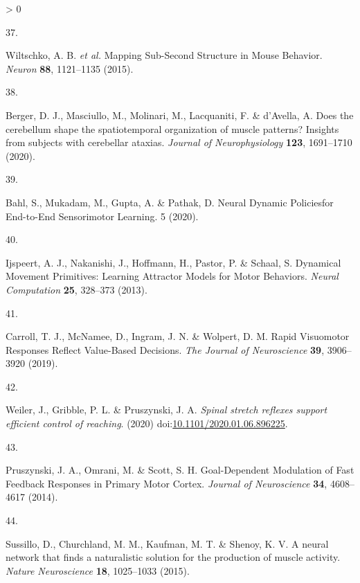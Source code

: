 \documentclass[
  a4paper,
]{article}
\newlength{\cslhangindent}
\newlength{\csllabelwidth}
\newenvironment{CSLReferences}[2] %
 {%
  \setlength{\parindent}{0pt}
  \ifodd #1 \everypar{\setlength{\hangindent}{\cslhangindent}}\ignorespaces\fi
  \ifnum #2 > 0
  \setlength{\parskip}{#2\baselineskip}
  \fi
 }%
 {}
\newcommand{\CSLLeftMargin}[1]{\parbox[t]{\csllabelwidth}{#1}}
\newcommand{\CSLRightInline}[1]{\parbox[t]{\linewidth - \csllabelwidth}{#1}\break}
\begin{document}
\begin{CSLReferences}{0}{0}
\leavevmode\hypertarget{ref-wiltschkoMappingSubSecondStructure2015}{}%
\CSLLeftMargin{37. }
\CSLRightInline{Wiltschko, A. B. \emph{et al.} Mapping {Sub}-{Second
Structure} in {Mouse Behavior}. \emph{Neuron} \textbf{88}, 1121--1135
(2015).}

\leavevmode\hypertarget{ref-bergerDoesCerebellumShape2020}{}%
\CSLLeftMargin{38. }
\CSLRightInline{Berger, D. J., Masciullo, M., Molinari, M., Lacquaniti,
F. \& d'Avella, A. Does the cerebellum shape the spatiotemporal
organization of muscle patterns? {Insights} from subjects with
cerebellar ataxias. \emph{Journal of Neurophysiology} \textbf{123},
1691--1710 (2020).}

\leavevmode\hypertarget{ref-bahlNeuralDynamicPoliciesfor2020}{}%
\CSLLeftMargin{39. }
\CSLRightInline{Bahl, S., Mukadam, M., Gupta, A. \& Pathak, D. Neural
{Dynamic Policiesfor End}-to-{End Sensorimotor Learning}. 5 (2020).}

\leavevmode\hypertarget{ref-ijspeertDynamicalMovementPrimitives2013}{}%
\CSLLeftMargin{40. }
\CSLRightInline{Ijspeert, A. J., Nakanishi, J., Hoffmann, H., Pastor, P.
\& Schaal, S. Dynamical {Movement Primitives}: {Learning Attractor
Models} for {Motor Behaviors}. \emph{Neural Computation} \textbf{25},
328--373 (2013).}

\leavevmode\hypertarget{ref-carrollRapidVisuomotorResponses2019}{}%
\CSLLeftMargin{41. }
\CSLRightInline{Carroll, T. J., McNamee, D., Ingram, J. N. \& Wolpert,
D. M. Rapid {Visuomotor Responses Reflect Value}-{Based Decisions}.
\emph{The Journal of Neuroscience} \textbf{39}, 3906--3920 (2019).}

\leavevmode\hypertarget{ref-weiler2020}{}%
\CSLLeftMargin{42. }
\CSLRightInline{Weiler, J., Gribble, P. L. \& Pruszynski, J. A.
\emph{Spinal stretch reflexes support efficient control of reaching}.
(2020)
doi:\href{https://doi.org/10.1101/2020.01.06.896225}{10.1101/2020.01.06.896225}.}

\leavevmode\hypertarget{ref-pruszynski2014}{}%
\CSLLeftMargin{43. }
\CSLRightInline{Pruszynski, J. A., Omrani, M. \& Scott, S. H.
Goal-{Dependent Modulation} of {Fast Feedback Responses} in {Primary
Motor Cortex}. \emph{Journal of Neuroscience} \textbf{34}, 4608--4617
(2014).}

\leavevmode\hypertarget{ref-sussillo2015}{}%
\CSLLeftMargin{44. }
\CSLRightInline{Sussillo, D., Churchland, M. M., Kaufman, M. T. \&
Shenoy, K. V. A neural network that finds a naturalistic solution for
the production of muscle activity. \emph{Nature Neuroscience}
\textbf{18}, 1025--1033 (2015).}


\end{CSLReferences}
\end{document}
